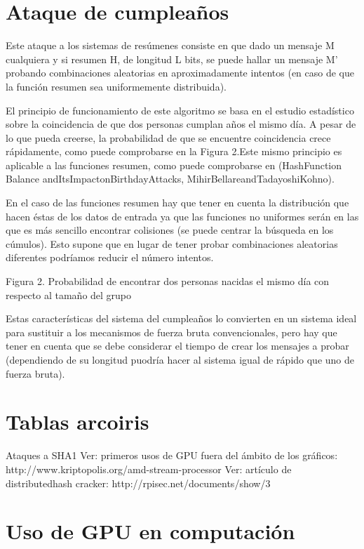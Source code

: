 \section{Ataque de cumpleaños}

Este ataque a los sistemas de resúmenes consiste en que dado un mensaje M cualquiera y si resumen H, de longitud L bits, se puede hallar un mensaje M’ probando combinaciones aleatorias en aproximadamente   intentos (en caso de que la función resumen sea uniformemente distribuida).

El principio de funcionamiento de este algoritmo se basa en el estudio estadístico sobre la coincidencia de que dos personas cumplan años el mismo día. A pesar de lo que pueda creerse, la probabilidad de que se encuentre coincidencia crece rápidamente, como puede comprobarse en la Figura 2.Este mismo principio es aplicable a las funciones resumen, como puede comprobarse en (HashFunction Balance andItsImpactonBirthdayAttacks, MihirBellareandTadayoshiKohno).

En el caso de las funciones resumen hay que tener en cuenta la distribución que hacen éstas de los datos de entrada ya que las funciones no uniformes serán en las que es más sencillo encontrar colisiones (se puede centrar la búsqueda en los cúmulos). Esto supone que en lugar de tener probar   combinaciones aleatorias diferentes podríamos reducir el número intentos.
 
Figura 2. Probabilidad de encontrar dos personas nacidas el mismo día con respecto al tamaño del grupo

Estas características del sistema del cumpleaños lo convierten en un sistema ideal para sustituir a los mecanismos de fuerza bruta convencionales, pero hay que tener en cuenta que se debe considerar el tiempo de crear los mensajes a probar (dependiendo de su longitud puodría hacer al sistema igual de rápido que uno de fuerza bruta).

\section{Tablas arcoiris}

Ataques a SHA1
Ver: primeros usos de GPU fuera del ámbito de los gráficos: http://www.kriptopolis.org/amd-stream-processor
Ver: artículo de distributedhash cracker: http://rpisec.net/documents/show/3

\section{Uso de GPU en computación}

